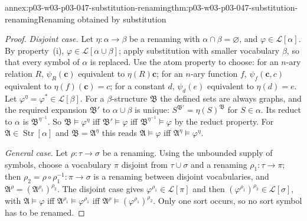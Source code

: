 \begin{annexitem}{annex:p03-w03-p03-047-substitution-renaming}{thm:p03-w03-p03-047-substitution-renaming}{Renaming obtained by substitution}
\begin{proof}
\emph{Disjoint case.}  Let \(\eta:\alpha\to\beta\) be a renaming with
\(\alpha\cap\beta=\varnothing\), and \(\varphi\in\mathscr L[\alpha]\).  By
property~(i), \(\varphi\in\mathscr L[\alpha\cup\beta]\); apply substitution
with smaller vocabulary \(\beta\), so that every symbol of \(\alpha\) is
replaced.  Use the atom property to choose: for an \(n\)-ary relation
\(R\), \(\psi_R(\mathbf c)\) equivalent to \(\eta(R)\mathbf c\); for an
\(n\)-ary function \(f\), \(\psi_f(\mathbf c,c)\) equivalent to
\(\eta(f)(\mathbf c)=c\); for a constant \(d\), \(\psi_d(e)\) equivalent to
\(\eta(d)=e\).  Let \(\varphi^\eta=\varphi^\ast\in\mathscr L[\beta]\).  For a
\(\beta\)-structure \(\mathfrak B\) the defined sets are always graphs, and
the required expansion \(\mathfrak B'\) to \(\alpha\cup\beta\) is unique:
\(S^{\mathfrak B'}=\eta(S)^{\mathfrak B}\) for \(S\in\alpha\).  Its reduct to
\(\alpha\) is \(\mathfrak B^{\eta^{-1}}\).  So \(\mathfrak B\models\varphi^\eta\)
iff \(\mathfrak B'\models\varphi\) iff \(\mathfrak B^{\eta^{-1}}\models\varphi\)
by the reduct property.  For \(\mathfrak A\in\operatorname{Str}[\alpha]\)
and \(\mathfrak B=\mathfrak A^\eta\) this reads
\(\mathfrak A\models\varphi\) iff \(\mathfrak A^\eta\models\varphi^\eta\).

\emph{General case.}  Let \(\rho:\tau\to\sigma\) be a renaming.  Using the
unbounded supply of symbols, choose a vocabulary \(\pi\) disjoint from
\(\tau\cup\sigma\) and a renaming \(\rho_1:\tau\to\pi\); then
\(\rho_2=\rho\circ\rho_1^{-1}:\pi\to\sigma\) is a renaming between disjoint
vocabularies, and \(\mathfrak A^\rho=(\mathfrak A^{\rho_1})^{\rho_2}\).  The
disjoint case gives \(\varphi^{\rho_1}\in\mathscr L[\pi]\) and then
\((\varphi^{\rho_1})^{\rho_2}\in\mathscr L[\sigma]\), with
\(\mathfrak A\models\varphi\) iff \(\mathfrak A^{\rho_1}\models\varphi^{\rho_1}\)
iff \(\mathfrak A^\rho\models(\varphi^{\rho_1})^{\rho_2}\).  Only one sort
occurs, so no sort symbol has to be renamed.
\end{proof}
\end{annexitem}

